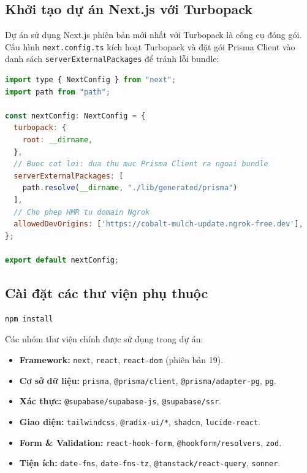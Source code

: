 \documentclass[14pt,a4paper]{report}
\begin{document}
\subsection{Khởi tạo dự án Next.js với Turbopack}

Dự án sử dụng Next.js phiên bản mới nhất với Turbopack là công cụ
đóng gói. Cấu hình \texttt{next.config.ts} kích hoạt Turbopack và
đặt gói Prisma Client vào danh sách \texttt{serverExternalPackages}
để tránh lỗi bundle:

\begin{lstlisting}[language=JavaScript, caption={next.config.ts -- Cấu hình Turbopack và Prisma}]
import type { NextConfig } from "next";
import path from "path";

const nextConfig: NextConfig = {
  turbopack: {
    root: __dirname,
  },
  // Buoc cot loi: dua thu muc Prisma Client ra ngoai bundle
  serverExternalPackages: [
    path.resolve(__dirname, "./lib/generated/prisma")
  ],
  // Cho phep HMR tu domain Ngrok
  allowedDevOrigins: ['https://cobalt-mulch-update.ngrok-free.dev'],
};

export default nextConfig;
\end{lstlisting}

\subsection{Cài đặt các thư viện phụ thuộc}

\begin{lstlisting}[language=bash, caption={Cài đặt toàn bộ dependencies}]
npm install
\end{lstlisting}

Các nhóm thư viện chính được sử dụng trong dự án:

\begin{itemize}
    \item \textbf{Framework:} \texttt{next}, \texttt{react},
          \texttt{react-dom} (phiên bản 19).
    \item \textbf{Cơ sở dữ liệu:} \texttt{prisma},
          \texttt{@prisma/client}, \texttt{@prisma/adapter-pg}, \texttt{pg}.
    \item \textbf{Xác thực:} \texttt{@supabase/supabase-js},
          \texttt{@supabase/ssr}.
    \item \textbf{Giao diện:} \texttt{tailwindcss},
          \texttt{@radix-ui/*}, \texttt{shadcn}, \texttt{lucide-react}.
    \item \textbf{Form \& Validation:} \texttt{react-hook-form},
          \texttt{@hookform/resolvers}, \texttt{zod}.
    \item \textbf{Tiện ích:} \texttt{date-fns}, \texttt{date-fns-tz},
          \texttt{@tanstack/react-query}, \texttt{sonner}.
\end{itemize}
\end{document}
